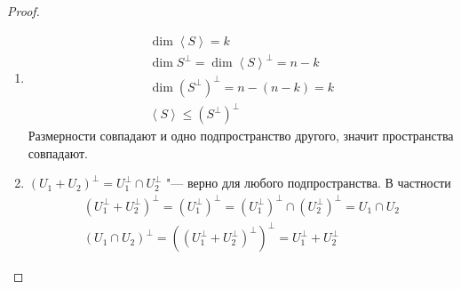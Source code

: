 \begin{proof}
\begin{enumerate}
	\item
		\begin{gather*}
			\dim \left<S\right> = k \\
			\dim S^\bot = \dim \left<S\right>^\bot = n - k \\
			\dim (S^\bot)^\bot = n - (n - k) = k \\
			\left<S\right> \le (S^\bot)^\bot
		\end{gather*}
		Размерности совпадают и одно подпространство другого, значит пространства совпадают.

	\item
		$(U_1 + U_2)^\bot = U_1^\bot \cap U_2^\bot$  "--- верно для любого подпространства.
		В частности
		\begin{gather*}
			(U_1^\bot + U_2^\bot)^\bot = (U_1^\bot)^\bot = (U_1^\bot)^\bot \cap (U_2^\bot)^\bot = U_1 \cap U_2 \\
			(U_1 \cap U_2)^\bot = ((U_1^\bot + U_2^\bot)^\bot)^\bot = U_1^\bot + U_2^\bot
		\end{gather*}
	\end{enumerate}
\end{proof}
